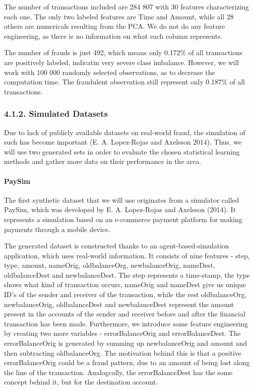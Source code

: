 \documentclass[12pt,]{article}
\let\oldparagraph\paragraph
\renewcommand{\paragraph}[1]{\oldparagraph{#1}\mbox{}}
\begin{document}
The number of transactions included are 284 807 with 30 features
characterizing each one. The only two labeled features are Time and
Amount, while all 28 others are numericals resulting from the PCA. We do
not do any feature engineering, as there is no information on what each
column represents.

The number of frauds is just 492, which means only 0.172\% of all
transactions are positively labeled, indicatin very severe class
imbalance. However, we will work with 100 000 randomly selected
observations, as to decrease the computation time. The fraudulent
observation still represent only 0.187\% of all transactions.

\hypertarget{simulated-datasets}{%
\subsubsection{4.1.2. Simulated Datasets}\label{simulated-datasets}}

Due to lack of publicly available datasets on real-world fraud, the
simulation of such has become important (E. A. Lopez-Rojas and Axelsson
2014). Thus, we will use two generated sets in order to evaluate the
chosen statistical learning methods and gather more data on their
performance in the area.

\hypertarget{paysim}{%
\paragraph{PaySim}\label{paysim}}

The first synthetic dataset that we will use originates from a simulator
called PaySim, which was developed by E. A. Lopez-Rojas and Axelsson
(2014). It represents a simulation based on an e-commerce payment
platform for making payments through a mobile device.

The generated dataset is constructed thanks to an agent-based-simulation
application, which uses real-world information. It consists of nine
features - step, type, amount, nameOrig, oldbalanceOrg, newbalanceOrig,
nameDest, oldbalanceDest and newbalanceDest. The step represents a
time-stamp, the type shows what kind of transaction occurs, nameOrig and
nameDest give us unique ID's of the sender and receiver of the
transaction, while the rest oldbalanceOrg, newbalanceOrig,
oldbalanceDest and newbalanceDest represent the amount present in the
accounts of the sender and receiver before and after the financial
transaction has been made. Furthermore, we introduce some feature
engineering by creating two more variables - errorBalanceOrig and
errorBalanceDest. The errorBalanceOrig is generated by summing up
newbalanceOrig and amount and then subtracting oldbalanceOrg. The
motivation behind this is that a positive errorBalanceOrig could be a
fraud pattern, due to an amount of being lost along the line of the
transaction. Analogcally, the errorBalanceDest has the some concept
behind it, but for the destination account.
\end{document}
